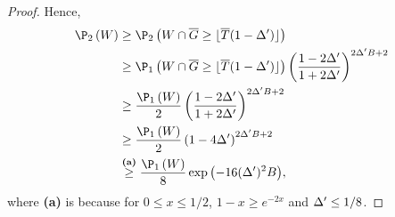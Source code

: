 \begin{proof}
	\noindent
	Hence,
	\begin{align*}
	\Pro_{2}\left(W \right)
	&\geq
	\Pro_{2}\left(W  \cap \sumlemma \geq \lfloor\pullearlyPhase (1-\gap')\rfloor\right)\\
	&\geq
	\Pro_{1}\left(W  \cap \sumlemma \geq \lfloor\pullearlyPhase (1-\gap')\rfloor\right)
	\left(\frac{1-2\gap'}{1+2\gap'}\right)^{2\gap'B+2}\\
	&\geq
	\frac{\Pro_{1}\left(W  \right)}{2}
	\left(\frac{1-2\gap'}{1+2\gap'}\right)^{2\gap'B+2}\\
	&\geq
	\frac{\Pro_{1}\left(W  \right)}{2}
	\left(1-4\gap'\right)^{2\gap'B+2}\\
	&\stackrel{\textbf{(a)}}{\geq}
	\frac{\Pro_{1}\left(W  \right)}{8}
	\exp\left(-16(\gap')^2B\right)\!,
	\end{align*}
	where \textbf{(a)} is because for $0\leq x\leq 1/2$, $1-x\geq e^{-2x}$ and $\Delta'\leq 1/8$.
%	
\end{proof}%